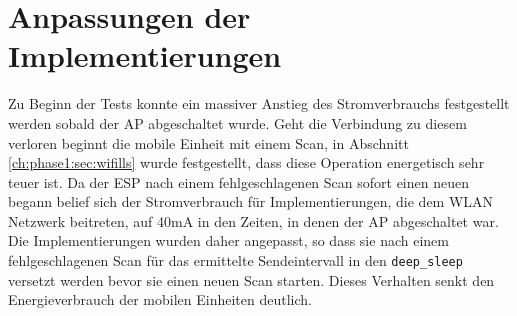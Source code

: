 \section{Anpassungen der Implementierungen}
Zu Beginn der Tests konnte ein massiver Anstieg des Stromverbrauchs festgestellt werden sobald der AP abgeschaltet wurde.
Geht die Verbindung zu diesem verloren beginnt die mobile Einheit mit einem Scan, in Abschnitt \ref{ch:phase1:sec:wifills} wurde festgestellt, dass diese Operation energetisch sehr teuer ist.
Da der ESP nach einem fehlgeschlagenen Scan sofort einen neuen begann belief sich der Stromverbrauch für Implementierungen, die dem WLAN Netzwerk beitreten, auf 40mA in den Zeiten, in denen der AP abgeschaltet war.
Die Implementierungen wurden daher angepasst, so dass sie nach einem fehlgeschlagenen Scan für das ermittelte Sendeintervall in den \texttt{deep\_sleep} versetzt werden bevor sie einen neuen Scan starten.
Dieses Verhalten senkt den Energieverbrauch der mobilen Einheiten deutlich.
